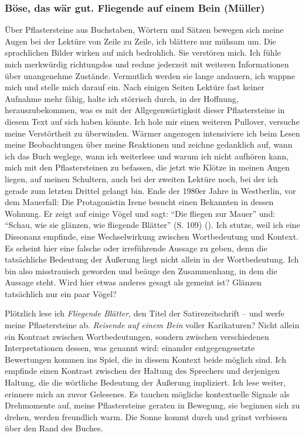 \documentclass[fontsize=12pt]{scrartcl}
\begin{document}
\newpage

\subsubsection{\flq B\"ose, das w\"ar gut\frq . Fliegende auf einem Bein (M\"uller)}
\label{subsubsec:5.4.3}

\"Uber Pflastersteine aus Buchstaben, W\"ortern und S\"atzen bewegen sich meine Augen bei der Lekt\"ure von Zeile zu Zeile, ich bl\"attere nur m\"uhsam um. Die sprachlichen Bilder wirken auf mich bedrohlich. Sie verst\"oren mich. Ich f\"uhle mich merkw\"urdig richtungslos und rechne jederzeit mit weiteren Informationen \"uber unangenehme Zust\"ande. Vermutlich werden sie lange andauern, ich wappne mich und stelle mich darauf ein. Nach einigen Sei\-ten Lekt\"ure fast keiner Aufnahme mehr f\"ahig, halte ich st\"orrisch durch, in der Hoffnung, he\-rauszubekommen, was es mit der Allgegenw\"artigkeit dieser Pflastersteine in diesem Text auf sich haben k\"onnte. Ich hole mir einen weiteren Pullover, versuche meine Verst\"ortheit zu \"uberwinden. W\"armer angezogen intensiviere ich beim Lesen meine Beobachtungen \"uber meine Reaktionen und zeichne gedanklich auf, wann ich das Buch weglege, wann ich weiterlese und warum ich nicht aufh\"oren kann, mich mit den Pflastersteinen zu befassen, die jetzt wie Kl\"otze in meinen Augen liegen, auf meinen Schultern, auch bei der zwei\-ten Lekt\"ure noch, bei der ich gerade zum letzten Drittel gelangt bin. Ende der 1980er Jahre in Westberlin, vor dem Mauerfall: Die Protagonistin\textsuperscript{\tiny *} Irene besucht einen Bekannten in dessen Wohnung. Er zeigt auf einige V\"ogel und sagt: "`Die fliegen zur Mauer"' und: "`Schau, wie sie gl\"anzen, wie fliegende Bl\"atter"' (S. 109) (\cite{Mueller1989}). Ich stutze, weil ich eine Dissonanz empfinde, eine Wechselwirkung zwischen Wortbedeutung und Kontext. Es scheint \mbox{hier} eine falsche oder irref\"uhrende Aussage zu geben, denn die tats\"achliche Bedeutung der \"Au{\ss}erung liegt nicht allein in der Wortbedeutung. Ich bin also miss\-trau\-isch geworden und be\"auge den Zusammenhang, in dem die Aussage steht. Wird \mbox{hier} etwas anderes gesagt als gemeint ist? Gl\"anzen tats\"achlich nur ein paar V\"ogel? 

Pl\"otzlich lese ich \textit{Fliegende Bl\"atter}, den Titel der Satirezeitschrift -- und werfe meine Pflastersteine ab. \textit{Reisende auf einem Bein} voller Karikaturen? Nicht allein ein Kontrast zwischen Wortbedeutungen, sondern zwischen verschiedenen Interpretationen dessen, was genannt wird: einander entgegengesetzte Bewertungen kommen ins Spiel, die in diesem Kontext beide m\"oglich sind. Ich empfinde einen Kontrast zwischen der Haltung des Sprechers\textsuperscript{\tiny *} und derjenigen Haltung, die die w\"ortliche Bedeutung der \"Au{\ss}erung impliziert. Ich lese weiter, erinnere mich an zuvor Gelesenes. Es tauchen m\"ogliche kontextuelle Signale als Drehmomente auf, meine Pflastersteine geraten in Bewegung, sie beginnen sich zu drehen, werden freundlich warm. Die Sonne kommt durch und grinst verbissen \"uber den Rand des Buches.
\end{document}
